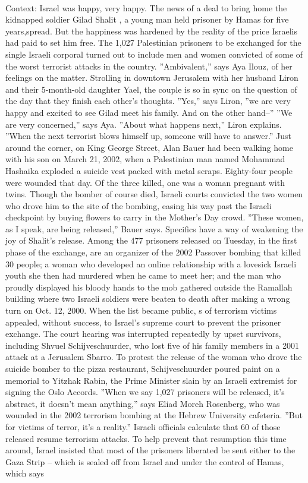 \documentclass[11pt,a4paper, onecolumn]{article}
\begin{document}
\\ Context: Israel was happy, very happy. The news of a deal to bring home the kidnapped soldier Gilad Shalit , a young man held prisoner by Hamas for five years,spread. But the happiness was hardened by the reality of the price Israelis had paid to set him free. The 1,027 Palestinian prisoners to be exchanged for the single Israeli corporal turned out to include men and women convicted of some of the worst terrorist attacks in the country. ''Ambivalent,'' says Aya Ilouz, of her feelings on the matter. Strolling in downtown Jerusalem with her husband Liron and their 5-month-old daughter Yael, the couple is so in sync on the question of the day that they finish each other's thoughts. ''Yes,'' says Liron, ''we are very happy and excited to see Gilad meet his family. And on the other hand--'' ''We are very concerned,'' says Aya. ''About what happens next,'' Liron explains. ''When the next terrorist blows himself up, someone will have to answer.'' Just around the corner, on King George Street, Alan Bauer had been walking home with his son on March 21, 2002, when a Palestinian man named Mohammad Hashaika exploded a suicide vest packed with metal scraps. Eighty-four people were wounded that day. Of the three killed, one was a woman pregnant with twins. Though the bomber of course died, Israeli courts convicted the two women who drove him to the site of the bombing, easing his way past the Israeli checkpoint by buying flowers to carry in the Mother's Day crowd. ''These women, as I speak, are being released,'' Bauer says. Specifics have a way of weakening the joy of Shalit's release. Among the 477 prisoners released on Tuesday, in the first phase of the exchange, are an organizer of the 2002 Passover bombing that killed 30 people; a woman who developed an online relationship with a lovesick Israeli youth she then had murdered when he came to meet her; and the man who proudly displayed his bloody hands to the mob gathered outside the Ramallah building where two Israeli soldiers were beaten to death after making a wrong turn on Oct. 12, 2000. When the list became public, s of terrorism victims appealed, without success, to Israel's supreme court to prevent the prisoner exchange. The court hearing was interrupted repeatedly by upset survivors, including Shvuel Schijveschuurder, who lost five of his family members in a 2001 attack at a Jerusalem Sbarro. To protest the release of the woman who drove the suicide bomber to the pizza restaurant, Schijveschuurder poured paint on a memorial to Yitzhak Rabin, the Prime Minister slain by an Israeli extremist for signing the Oslo Accords. ''When we say 1,027 prisoners will be released, it's abstract, it doesn't mean anything,'' says Eliad Moreh Rosenberg, who was wounded in the 2002 terrorism bombing at the Hebrew University cafeteria. ''But for victims of terror, it's a reality.'' Israeli officials calculate that 60  of those released resume terrorism attacks. To help prevent that resumption this time around, Israel insisted that most of the prisoners liberated be sent either to the Gaza Strip -- which is sealed off from Israel and under the control of Hamas, which says 
\end{document}
